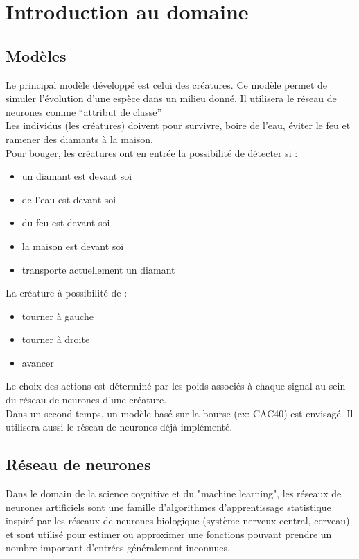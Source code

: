 \chapter{Introduction au domaine}

\section{Modèles}
Le principal modèle développé est celui des créatures.
Ce modèle permet de simuler l'évolution d'une espèce dans un milieu donné.
Il utilisera le réseau de neurones comme ``attribut de classe''\\
Les individus (les créatures) doivent pour survivre, boire de l'eau, éviter le feu et ramener des diamants à la maison.
\\Pour bouger, les créatures ont en entrée la possibilité de détecter si :\\

\begin{itemize}
 \item un diamant est devant soi
 \item de l'eau est devant soi
 \item du feu est devant soi
 \item la maison est devant soi
 \item transporte actuellement un diamant\\
\end{itemize}

La créature à possibilité de :
\begin{itemize}
 \item tourner à gauche
 \item tourner à droite
 \item avancer\\
 
\end{itemize}
 
Le choix des actions est déterminé par les poids associés à chaque signal au sein du réseau de neurones d'une créature.\\

Dans un second temps, un modèle basé sur la bourse (ex: CAC40) est envisagé.
Il utilisera aussi le réseau de neurones déjà implémenté.

\section{Réseau de neurones}

Dans le domain de la science cognitive et du "machine learning", les réseaux de neurones artificiels sont une famille d'algorithmes d'apprentissage statistique inspiré par les réseaux de neurones biologique (système nerveux central, cerveau) et sont utilisé pour estimer ou approximer une fonctions pouvant prendre un nombre important d'entrées généralement inconnues.\\

